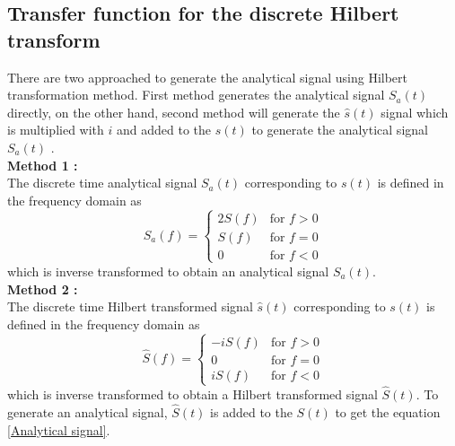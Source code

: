 \subsection*{Transfer function for the discrete Hilbert transform}
There are two approached to generate the analytical signal using Hilbert transformation method. First method generates the analytical signal $S_a(t)$ directly, on the other hand, second method will generate the $\hat{s}(t)$ signal which is multiplied with $i$ and added to the ${s}(t)$ to generate the analytical signal $S_a(t)$ .\\
\textbf{Method 1 :}\\
The discrete time analytical signal $S_a(t)$ corresponding to  ${s}(t)$ is defined in the frequency domain as \cite{Marple}
\begin{equation}
S_a(f) = \begin{cases}
2S(f) &\text{for $f>0$}\\ 
S(f) &\text{for $f=0$}\\ 
0 &\text{for $f<0$}
\end{cases}
\end{equation}
which is inverse transformed to obtain an analytical signal $S_a(t)$.\\
\textbf{Method 2 :}\\
The discrete time Hilbert transformed signal  $\hat{s}(t)$ corresponding to  ${s}(t)$ is defined in the frequency domain as \cite{Oppenheim1999}
\begin{equation}
 \hat{S}(f)= \begin{cases}
-i S(f) &\text{for $f>0$}\\ 
0 &\text{for $f=0$}\\ 
i S(f) &\text{for $f<0$}
\end{cases}
\end{equation}
which is inverse transformed to obtain a Hilbert transformed signal $\hat{S}(t)$. To generate an analytical signal,  $\hat{S}(t)$ is added to the $S(t)$ to get the equation \ref{Analytical signal}.\\
